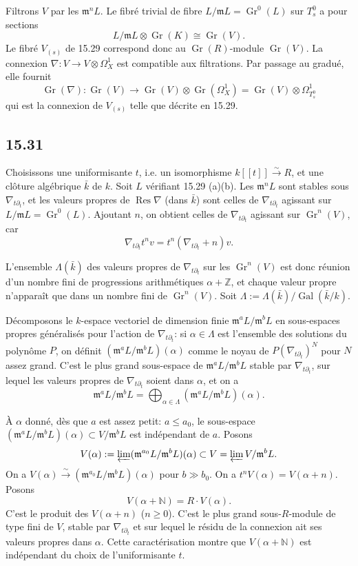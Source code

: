 \documentclass[12pt,a4paper]{article}
\theoremstyle{plain}
\theoremstyle{definition}
\theoremstyle{remark}
\DeclareMathOperator{\Gr}{Gr}
\DeclareMathOperator{\Res}{Res}
\DeclareMathOperator{\Gal}{Gal}
\newcommand{\bZ}{\mathbb{Z}}
\newcommand{\bN}{\mathbb{N}}
\begin{document}
Filtrons $V$ par les $\mathfrak{m}^n L$. Le fibré trivial de fibre $L/\mathfrak{m}L = \Gr^0(L)$ sur $T_s^0$ a pour sections
\[
L/\mathfrak{m}L \otimes \Gr(K) \cong \Gr(V).
\]
Le fibré $V_{(s)}$ de 15.29 correspond donc au $\Gr(R)$-module $\Gr(V)$. La connexion $\nabla: V \to V \otimes \Omega_X^1$ est compatible aux filtrations. Par passage au gradué, elle fournit
\[
\Gr(\nabla): \Gr(V) \to \Gr(V) \otimes \Gr(\Omega_X^1) = \Gr(V) \otimes \Omega_{T_s^0}^1
\]
qui est la connexion de $V_{(s)}$ telle que décrite en 15.29.

\subsection*{15.31}

Choisissons une uniformisante $t$, i.e. un isomorphisme $k[[t]] \xrightarrow{\sim} R$, et une clôture algébrique $\bar{k}$ de $k$. Soit $L$ vérifiant 15.29 (a)(b). Les $\mathfrak{m}^n L$ sont stables sous $\nabla_{t\partial_t}$, et les valeurs propres de $\Res \nabla$ (dans $\bar{k}$) sont celles de $\nabla_{t\partial_t}$ agissant sur $L/\mathfrak{m}L = \Gr^0(L)$. Ajoutant $n$, on obtient celles de $\nabla_{t\partial_t}$ agissant sur $\Gr^n(V)$, car
\[
\nabla_{t\partial_t} t^n v = t^n(\nabla_{t\partial_t} + n)v.
\]

L'ensemble $\Lambda(\bar{k})$ des valeurs propres de $\nabla_{t\partial_t}$ sur les $\Gr^n(V)$ est donc réunion d'un nombre fini de progressions arithmétiques $\alpha + \bZ$, et chaque valeur propre n'apparaît que dans un nombre fini de $\Gr^n(V)$. Soit $\Lambda := \Lambda(\bar{k})/\Gal(\bar{k}/k)$.

Décomposons le $k$-espace vectoriel de dimension finie $\mathfrak{m}^a L/\mathfrak{m}^b L$ en sous-espaces propres généralisés pour l'action de $\nabla_{t\partial_t}$: si $\alpha \in \Lambda$ est l'ensemble des solutions du polynôme $P$, on définit $(\mathfrak{m}^a L/\mathfrak{m}^b L)(\alpha)$ comme le noyau de $P(\nabla_{t\partial_t})^N$ pour $N$ assez grand. C'est le plus grand sous-espace de $\mathfrak{m}^a L/\mathfrak{m}^b L$ stable par $\nabla_{t\partial_t}$, sur lequel les valeurs propres de $\nabla_{t\partial_t}$ soient dans $\alpha$, et on a
\[
\mathfrak{m}^a L/\mathfrak{m}^b L = \bigoplus_{\alpha \in \Lambda} (\mathfrak{m}^a L/\mathfrak{m}^b L)(\alpha).
\]

À $\alpha$ donné, dès que $a$ est assez petit: $a \leqslant a_0$, le sous-espace $(\mathfrak{m}^a L/\mathfrak{m}^b L)(\alpha) \subset V/\mathfrak{m}^b L$ est indépendant de $a$. Posons
\[
V(\alpha) := \varprojlim (\mathfrak{m}^{a_0} L/\mathfrak{m}^b L)(\alpha) \subset V = \varprojlim V/\mathfrak{m}^b L.
\]
On a $V(\alpha) \xrightarrow{\sim} (\mathfrak{m}^{a_0} L/\mathfrak{m}^b L)(\alpha)$ pour $b \gg b_0$. On a $t^n V(\alpha) = V(\alpha + n)$. Posons
\[
V(\alpha + \bN) = R \cdot V(\alpha).
\]
C'est le produit des $V(\alpha + n)$ ($n \geqslant 0$). C'est le plus grand sous-$R$-module de type fini de $V$, stable par $\nabla_{t\partial_t}$ et sur lequel le résidu de la connexion ait ses valeurs propres dans $\alpha$. Cette caractérisation montre que $V(\alpha + \bN)$ est indépendant du choix de l'uniformisante $t$.
\end{document}
